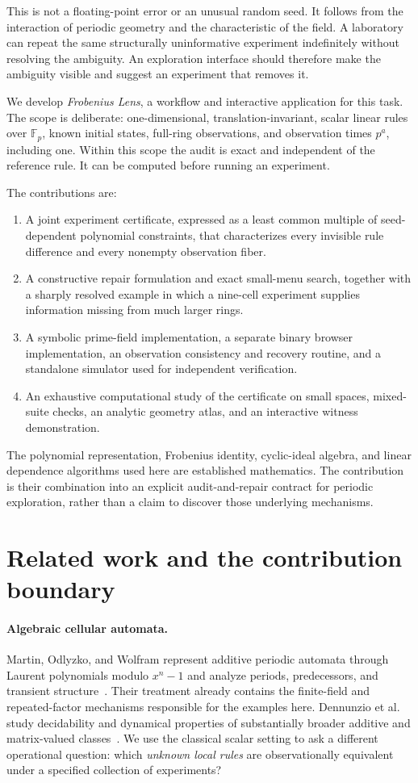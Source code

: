 \documentclass{ijuc}
\newcommand{\Fp}{\mathbb F_p}
\begin{document}
This is not a floating-point error or an unusual random seed. It follows from the interaction of periodic geometry and the characteristic of the field. A laboratory can repeat the same structurally uninformative experiment indefinitely without resolving the ambiguity. An exploration interface should therefore make the ambiguity visible and suggest an experiment that removes it.

We develop \emph{Frobenius Lens}, a workflow and interactive application for this task. The scope is deliberate: one-dimensional, translation-invariant, scalar linear rules over $\Fp$, known initial states, full-ring observations, and observation times $p^a$, including one. Within this scope the audit is exact and independent of the reference rule. It can be computed before running an experiment.

The contributions are:
\begin{enumerate}
\item A joint experiment certificate, expressed as a least common multiple of seed-dependent polynomial constraints, that characterizes every invisible rule difference and every nonempty observation fiber.
\item A constructive repair formulation and exact small-menu search, together with a sharply resolved example in which a nine-cell experiment supplies information missing from much larger rings.
\item A symbolic prime-field implementation, a separate binary browser implementation, an observation consistency and recovery routine, and a standalone simulator used for independent verification.
\item An exhaustive computational study of the certificate on small spaces, mixed-suite checks, an analytic geometry atlas, and an interactive witness demonstration.
\end{enumerate}
The polynomial representation, Frobenius identity, cyclic-ideal algebra, and linear dependence algorithms used here are established mathematics. The contribution is their combination into an explicit audit-and-repair contract for periodic exploration, rather than a claim to discover those underlying mechanisms.

\section{Related work and the contribution boundary}
\paragraph{Algebraic cellular automata.}
Martin, Odlyzko, and Wolfram represent additive periodic automata through Laurent polynomials modulo $x^n-1$ and analyze periods, predecessors, and transient structure~\cite{martin1984}. Their treatment already contains the finite-field and repeated-factor mechanisms responsible for the examples here. Dennunzio et al. study decidability and dynamical properties of substantially broader additive and matrix-valued classes~\cite{dennunzio2020}. We use the classical scalar setting to ask a different operational question: which \emph{unknown local rules} are observationally equivalent under a specified collection of experiments?
\end{document}
